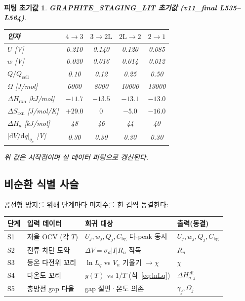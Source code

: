 \documentclass[11pt,a4paper]{article}
\newtheorem*{parambox}{피팅 초기값}
\newcommand{\dd}{\mathrm{d}}
\newcommand{\eff}{\mathrm{eff}}
\newcommand{\bg}{\mathrm{bg}}
\newcommand{\cell}{\mathrm{cell}}
\begin{document}
\begin{parambox}
\textbf{GRAPHITE\_STAGING\_LIT 초기값 (v11\_final L535--L564)}.
\begin{center}
\renewcommand{\arraystretch}{1.25}
\begin{tabular}{p{} cccc}
\toprule
인자 & $4\to3$ & $3\to2\mathrm L$ & $2\mathrm L\to2$ & $2\to1$ \\
\midrule
$U$ [V] & 0.210 & 0.140 & 0.120 & 0.085 \\
$w$ [V] & 0.020 & 0.016 & 0.014 & 0.012 \\
$Q/Q_\cell$ & 0.10 & 0.12 & 0.25 & 0.50 \\
$\Omega$ [J/mol] & 6000 & 8000 & 10000 & 13000 \\
$\Delta H_\text{rxn}$ [kJ/mol] & $-11.7$ & $-13.5$ & $-13.1$ & $-13.0$ \\
$\Delta S_\text{rxn}$ [J/mol/K] & $+29.0$ & $0$ & $-5.0$ & $-16.0$ \\
$\Delta H_a$ [kJ/mol] & 48 & 46 & 44 & 40 \\
$|\dd V/\dd q|_{q_a}$ [V] & 0.30 & 0.30 & 0.30 & 0.30 \\
\bottomrule
\end{tabular}
\end{center}
위 값은 시작점이며 실 데이터 피팅으로 갱신된다.
\end{parambox}

\subsection{비순환 식별 사슬}

공선형 방지를 위해 단계마다 미지수를 한 겹씩 동결한다:

\begin{center}
\renewcommand{\arraystretch}{1.3}
\begin{tabular}{p{} p{} p{} p{}}
\toprule
단계 & 입력 데이터 & 회귀 대상 & 출력(동결)\\
\midrule
S1 & 저율 OCV (각 $T$) & $U_j, w_j, Q_j, C_\bg$ 다-peak 동시 & $U_j, w_j, Q_j, C_\bg$\\
S2 & 전류 차단 도약 & $\Delta V = \sigma_d|I|R_n$ 직독 & $R_n$\\
S3 & 등온 다전위 꼬리 & $\ln L_q$ vs $V_n$ 기울기 $\to\chi$ & $\chi$\\
S4 & 다온도 꼬리 & $y(T)$ vs $1/T$ (식~\eqref{eq:lnLq}) & $\Delta H_{a,j}^\eff$\\
S5 & 충방전 gap 다율 & gap 절편·온도 의존 & $\gamma_j, \Omega_j$\\
\bottomrule
\end{tabular}
\end{center}
\end{document}

